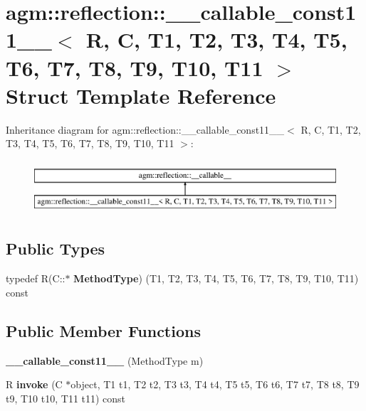 \hypertarget{structagm_1_1reflection_1_1____callable__const11____}{}\section{agm\+:\+:reflection\+:\+:\+\_\+\+\_\+callable\+\_\+const11\+\_\+\+\_\+$<$ R, C, T1, T2, T3, T4, T5, T6, T7, T8, T9, T10, T11 $>$ Struct Template Reference}
\label{structagm_1_1reflection_1_1____callable__const11____}
Inheritance diagram for agm\+:\+:reflection\+:\+:\+\_\+\+\_\+callable\+\_\+const11\+\_\+\+\_\+$<$ R, C, T1, T2, T3, T4, T5, T6, T7, T8, T9, T10, T11 $>$\+:\begin{figure}[H]
\begin{center}
\leavevmode
\includegraphics[height=2.000000cm]{structagm_1_1reflection_1_1____callable__const11____}
\end{center}
\end{figure}
\subsection*{Public Types}
\begin{DoxyCompactItemize}
\item 
typedef R(C\+::$\ast$ {\bfseries Method\+Type}) (T1, T2, T3, T4, T5, T6, T7, T8, T9, T10, T11) const \hypertarget{structagm_1_1reflection_1_1____callable__const11_____a2acaf5dcd09588092b540687c0bc9111}{}\label{structagm_1_1reflection_1_1____callable__const11_____a2acaf5dcd09588092b540687c0bc9111}

\end{DoxyCompactItemize}
\subsection*{Public Member Functions}
\begin{DoxyCompactItemize}
\item 
{\bfseries \+\_\+\+\_\+callable\+\_\+const11\+\_\+\+\_\+} (Method\+Type m)\hypertarget{structagm_1_1reflection_1_1____callable__const11_____aadfd7d76713461f2ebc8fd6e96c6842b}{}\label{structagm_1_1reflection_1_1____callable__const11_____aadfd7d76713461f2ebc8fd6e96c6842b}

\item 
R {\bfseries invoke} (C $\ast$object, T1 t1, T2 t2, T3 t3, T4 t4, T5 t5, T6 t6, T7 t7, T8 t8, T9 t9, T10 t10, T11 t11) const \hypertarget{structagm_1_1reflection_1_1____callable__const11_____a189ce7a7ce3748dc355aa418706f6d7b}{}\label{structagm_1_1reflection_1_1____callable__const11_____a189ce7a7ce3748dc355aa418706f6d7b}

\end{DoxyCompactItemize}
